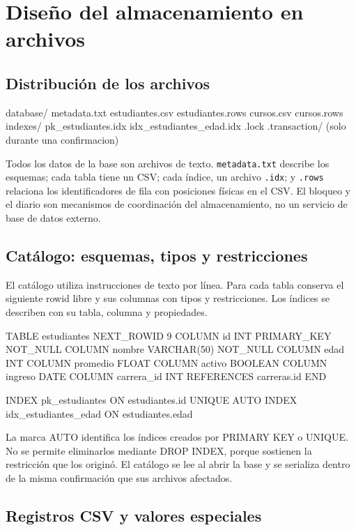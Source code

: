 \documentclass[11pt,a4paper]{article}
\begin{document}
\section{Diseño del almacenamiento en archivos}
\subsection{Distribución de los archivos}

\begin{archivo}
database/
  metadata.txt
  estudiantes.csv
  estudiantes.rows
  cursos.csv
  cursos.rows
  indexes/
    pk_estudiantes.idx
    idx_estudiantes_edad.idx
  .lock
  .transaction/           (solo durante una confirmacion)
\end{archivo}

Todos los datos de la base son archivos de texto. \texttt{metadata.txt}
describe los esquemas; cada tabla tiene un CSV; cada índice, un archivo
\texttt{.idx}; y \texttt{.rows} relaciona los identificadores de fila con
posiciones físicas en el CSV. El bloqueo y el diario son mecanismos de
coordinación del almacenamiento, no un servicio de base de datos externo.

\subsection{Catálogo: esquemas, tipos y restricciones}

El catálogo utiliza instrucciones de texto por línea. Para cada tabla
conserva el siguiente rowid libre y sus columnas con tipos y restricciones.
Los índices se describen con su tabla, columna y propiedades.

\begin{archivo}
TABLE estudiantes
  NEXT_ROWID 9
  COLUMN id INT PRIMARY_KEY NOT_NULL
  COLUMN nombre VARCHAR(50) NOT_NULL
  COLUMN edad INT
  COLUMN promedio FLOAT
  COLUMN activo BOOLEAN
  COLUMN ingreso DATE
  COLUMN carrera_id INT REFERENCES carreras.id
END

INDEX pk_estudiantes ON estudiantes.id UNIQUE AUTO
INDEX idx_estudiantes_edad ON estudiantes.edad
\end{archivo}

La marca AUTO identifica los índices creados por PRIMARY KEY o UNIQUE.
No se permite eliminarlos mediante DROP INDEX, porque sostienen la
restricción que los originó. El catálogo se lee al abrir la base y se
serializa dentro de la misma confirmación que sus archivos afectados.

\subsection{Registros CSV y valores especiales}
\end{document}
